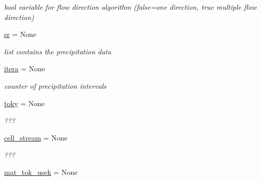 \begin{DoxyCompactItemize}
\begin{DoxyCompactList}\small\item\em bool variable for flow direction algorithm (false=one direction, true multiple flow direction) \end{DoxyCompactList}\item 
\hypertarget{classsmoderp2d_1_1src_1_1main__classes_1_1General_1_1Globals_a3e0e20f9176af85d6f922f170d235ec2}{\hyperlink{classsmoderp2d_1_1src_1_1main__classes_1_1General_1_1Globals_a3e0e20f9176af85d6f922f170d235ec2}{sr} = None}\label{classsmoderp2d_1_1src_1_1main__classes_1_1General_1_1Globals_a3e0e20f9176af85d6f922f170d235ec2}

\begin{DoxyCompactList}\small\item\em list contains the precipitation data \end{DoxyCompactList}\item 
\hypertarget{classsmoderp2d_1_1src_1_1main__classes_1_1General_1_1Globals_a7cc33c7a609bbfacacf886070ac076ff}{\hyperlink{classsmoderp2d_1_1src_1_1main__classes_1_1General_1_1Globals_a7cc33c7a609bbfacacf886070ac076ff}{itera} = None}\label{classsmoderp2d_1_1src_1_1main__classes_1_1General_1_1Globals_a7cc33c7a609bbfacacf886070ac076ff}

\begin{DoxyCompactList}\small\item\em counter of precipitation intervals \end{DoxyCompactList}\item 
\hypertarget{classsmoderp2d_1_1src_1_1main__classes_1_1General_1_1Globals_a939f71c7e4d61c99e6be02bbae931879}{\hyperlink{classsmoderp2d_1_1src_1_1main__classes_1_1General_1_1Globals_a939f71c7e4d61c99e6be02bbae931879}{toky} = None}\label{classsmoderp2d_1_1src_1_1main__classes_1_1General_1_1Globals_a939f71c7e4d61c99e6be02bbae931879}

\begin{DoxyCompactList}\small\item\em ??? \end{DoxyCompactList}\item 
\hypertarget{classsmoderp2d_1_1src_1_1main__classes_1_1General_1_1Globals_a529c1fe1f33e4b2bb4de2ae60f90ee8c}{\hyperlink{classsmoderp2d_1_1src_1_1main__classes_1_1General_1_1Globals_a529c1fe1f33e4b2bb4de2ae60f90ee8c}{cell\-\_\-stream} = None}\label{classsmoderp2d_1_1src_1_1main__classes_1_1General_1_1Globals_a529c1fe1f33e4b2bb4de2ae60f90ee8c}

\begin{DoxyCompactList}\small\item\em ??? \end{DoxyCompactList}\item 
\hypertarget{classsmoderp2d_1_1src_1_1main__classes_1_1General_1_1Globals_a0268885de5c8dea73da3a5803a907c1c}{\hyperlink{classsmoderp2d_1_1src_1_1main__classes_1_1General_1_1Globals_a0268885de5c8dea73da3a5803a907c1c}{mat\-\_\-tok\-\_\-usek} = None}\label{classsmoderp2d_1_1src_1_1main__classes_1_1General_1_1Globals_a0268885de5c8dea73da3a5803a907c1c}


\end{DoxyCompactItemize}
